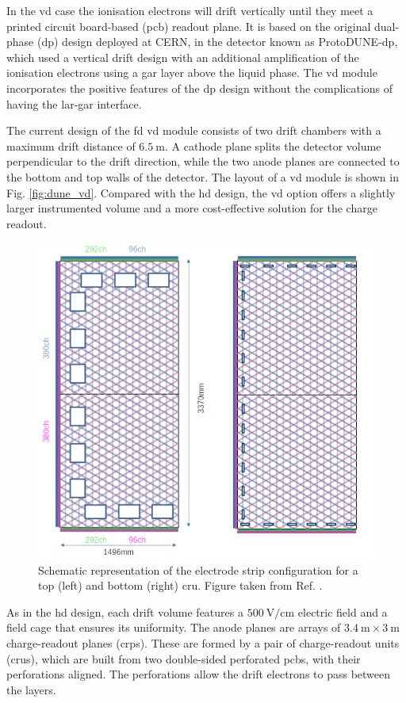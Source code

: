 In the \gls{vd} case the ionisation electrons will drift vertically until they meet a printed circuit board-based (\gls{pcb}) readout plane. It is based on the original dual-phase (\gls{dp}) design deployed at CERN, in the detector known as ProtoDUNE-\gls{dp}, which used a vertical drift design with an additional amplification of the ionisation electrons using a \gls{gar} layer above the liquid phase. The \gls{vd} module incorporates the positive features of the \gls{dp} design without the complications of having the \gls{lar}-\gls{gar} interface.

The current design of the \gls{fd} \gls{vd} module consists of two drift chambers with a maximum drift distance of $6.5~\mathrm{m}$. A cathode plane splits the detector volume perpendicular to the drift direction, while the two anode planes are connected to the bottom and top walls of the detector. The layout of a \gls{vd} module is shown in Fig. \ref{fig:dune_vd}. Compared with the \gls{hd} design, the \gls{vd} option offers a slightly larger instrumented volume and a more cost-effective solution for the charge readout.

\begin{figure}[t]
	\centering
	\includegraphics[width=0.70\linewidth]{Images/DUNE/FD/3V_anode_layout}
	\caption[Schematic representation of the electrode strip configuration for a top and bottom \gls{cru}.]{Schematic representation of the electrode strip configuration for a top (left) and bottom (right) \gls{cru}. Figure taken from Ref. \cite{DUNEVDTDR}.}
	\label{fig:dune_cru}
\end{figure}

As in the \gls{hd} design, each drift volume features a $500~\mathrm{V/cm}$ electric field and a field cage that ensures its uniformity. The anode planes are arrays of $3.4~\mathrm{m}\times3~\mathrm{m}$ charge-readout planes (\gls{crp}s). These are formed by a pair of charge-readout units (\gls{cru}s), which are built from two double-sided perforated \gls{pcb}s, with their perforations aligned. The perforations allow the drift electrons to pass between the layers.

